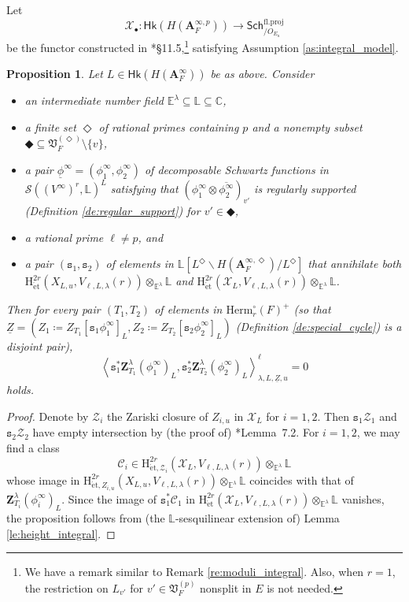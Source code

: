 \documentclass[12pt]{amsart}
\numberwithin{equation}{section}
\theoremstyle{plain}
\newtheorem{proposition}{Proposition}[section]
\theoremstyle{definition}
\theoremstyle{remark}
\renewcommand{\b}[1]{\mathbf{#1}}
\renewcommand{\c}[1]{\mathcal{#1}}
\renewcommand{\d}[1]{\mathbb{#1}}
\newcommand{\f}[1]{\mathfrak{#1}}
\renewcommand{\r}[1]{\mathrm{#1}}
\newcommand{\s}[1]{\mathscr{#1}}
\renewcommand{\sf}[1]{\mathsf{#1}}
\renewcommand{\(}{\left(}
\renewcommand{\)}{\right)}
\newcommand{\ol}[1]{\overline{#1}{}}
\newcommand{\ul}{\underline}
\newcommand{\bA}{\b A}
\newcommand{\cC}{\c C}
\newcommand{\cX}{\c X}
\newcommand{\cZ}{\c Z}
\newcommand{\dC}{\d C}
\newcommand{\dE}{\d E}
\newcommand{\dL}{\d L}
\newcommand{\fV}{\f V}
\newcommand{\rH}{\r H}
\newcommand{\sS}{\s S}
\newcommand{\ts}{\mathtt{s}}
\newcommand{\bbZ}{\boldsymbol{Z}}
\newcommand{\llangle}{\left\langle}
\newcommand{\rrangle}{\right\rangle}
\newcommand{\et}{{\acute{\r{e}}\r{t}}}
\newcommand{\Herm}{\r{Herm}}
\newcommand{\proj}{\r{fl.proj}}
\newcommand{\Sch}{\sf{Sch}}
\newcommand{\Hk}{\sf{Hk}}
\begin{document}
Let
\[
\cX_\bullet\colon \Hk(H(\bA_F^{\infty,p}))\to\Sch^\proj_{/O_{E_u}}
\]
be the functor constructed in \cite{LZ22}*{\S11.5},\footnote{We have a remark similar to Remark \ref{re:moduli_integral}. Also, when $r=1$, the restriction on $L_{v'}$ for $v'\in\fV_F^{(p)}$ nonsplit in $E$ is not needed.} satisfying Assumption \ref{as:integral_model}.


\begin{proposition}\label{pr:height_split}
Let $L\in\Hk(H(\bA_F^\infty))$ be as above. Consider
\begin{itemize}
  \item an intermediate number field $\dE^\lambda\subseteq\dL\subseteq\dC$,

  \item a finite set $\Diamond$ of rational primes containing $p$ and a nonempty subset $\Diamondblack\subseteq\fV_F^{(\Diamond)}\setminus\{v\}$,

  \item a pair $\ul\phi^\infty=(\phi^\infty_1,\phi^\infty_2)$ of decomposable Schwartz functions in $\sS((V^\infty)^r,\dL)^L$ satisfying that $(\phi^\infty_1\otimes\ol{\phi^\infty_2})_{v'}$ is regularly supported (Definition \ref{de:regular_support}) for $v'\in\Diamondblack$,

  \item a rational prime $\ell\neq p$, and

  \item a pair $(\ts_1,\ts_2)$ of elements in $\dL[L^\Diamond\backslash H(\bA_F^{\infty,\Diamond})/L^\Diamond]$ that annihilate both $\rH^{2r}_{\et}(X_{L,u},V_{\ell,L,\lambda}(r))\otimes_{\dE^\lambda}\dL$ and  $\rH^{2r}_{\et}(\cX_L,V_{\ell,L,\lambda}(r))\otimes_{\dE^\lambda}\dL$.
\end{itemize}
Then for every pair $(T_1,T_2)$ of elements in $\Herm_r^\circ(F)^+$ (so that $\ul{Z}=(Z_1\coloneqq Z_{T_1}[\ts_1\phi^\infty_1]_L,Z_2\coloneqq Z_{T_2}[\ts_2\phi^\infty_2]_L)$ (Definition \ref{de:special_cycle}) is a disjoint pair),
\[
\llangle\ts_1^*\bbZ^\lambda_{T_1}(\phi^\infty_1)_L,\ts_2^*\bbZ^\lambda_{T_2}(\phi^\infty_2)_L\rrangle_{\lambda,L,\ul{Z},u}^\ell=0
\]
holds.
\end{proposition}

\begin{proof}
Denote by $\cZ_i$ the Zariski closure of $Z_{i,u}$ in $\cX_L$ for $i=1,2$. Then $\ts_1\cZ_1$ and $\ts_2\cZ_2$ have empty intersection by (the proof of) \cite{LL21}*{Lemma~7.2}. For $i=1,2$, we may find a class
\[
\cC_i\in\rH^{2r}_{\et,\cZ_i}(\cX_L,V_{\ell,L,\lambda}(r))\otimes_{\dE^\lambda}\dL
\]
whose image in $\rH^{2r}_{\et,Z_{i,u}}(X_{L,u},V_{\ell,L,\lambda}(r))\otimes_{\dE^\lambda}\dL$ coincides with that of $\bbZ^\lambda_{T_i}(\phi^\infty_i)_L$. Since the image of $\ts_1^*\cC_1$ in $\rH^{2r}_{\et}(\cX_L,V_{\ell,L,\lambda}(r))\otimes_{\dE^\lambda}\dL$ vanishes, the proposition follows from (the $\dL$-sesquilinear extension of) Lemma \ref{le:height_integral}.
\end{proof}
\end{document}
